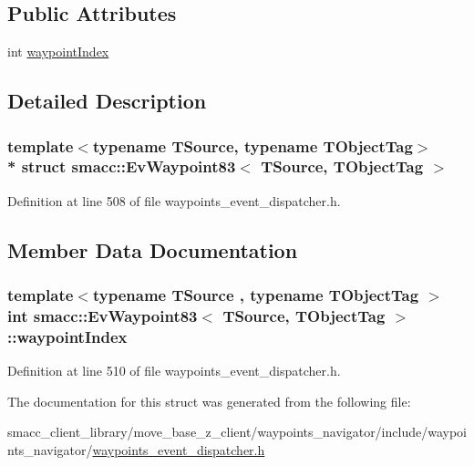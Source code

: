 \subsection*{Public Attributes}
\begin{DoxyCompactItemize}
\item 
int \hyperlink{structsmacc_1_1EvWaypoint83_a01a9500ffd602b640786f2f338936a9f}{waypoint\+Index}
\end{DoxyCompactItemize}


\subsection{Detailed Description}
\subsubsection*{template$<$typename T\+Source, typename T\+Object\+Tag$>$\\*
struct smacc\+::\+Ev\+Waypoint83$<$ T\+Source, T\+Object\+Tag $>$}



Definition at line 508 of file waypoints\+\_\+event\+\_\+dispatcher.\+h.



\subsection{Member Data Documentation}
\subsubsection[{\texorpdfstring{waypoint\+Index}{waypointIndex}}]{\setlength{\rightskip}{0pt plus 5cm}template$<$typename T\+Source , typename T\+Object\+Tag $>$ int {\bf smacc\+::\+Ev\+Waypoint83}$<$ T\+Source, T\+Object\+Tag $>$\+::waypoint\+Index}\hypertarget{structsmacc_1_1EvWaypoint83_a01a9500ffd602b640786f2f338936a9f}{}\label{structsmacc_1_1EvWaypoint83_a01a9500ffd602b640786f2f338936a9f}


Definition at line 510 of file waypoints\+\_\+event\+\_\+dispatcher.\+h.



The documentation for this struct was generated from the following file\+:\begin{DoxyCompactItemize}
\item 
smacc\+\_\+client\+\_\+library/move\+\_\+base\+\_\+z\+\_\+client/waypoints\+\_\+navigator/include/waypoints\+\_\+navigator/\hyperlink{waypoints__event__dispatcher_8h}{waypoints\+\_\+event\+\_\+dispatcher.\+h}\end{DoxyCompactItemize}
